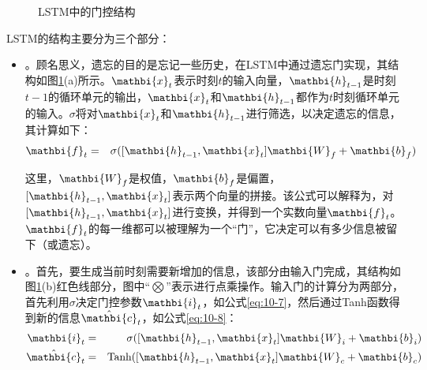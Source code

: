 \begin{figure}[htp]
\centering
{}
\caption{LSTM中的门控结构}
\label{fig:10-11}
\end{figure}

\parinterval LSTM的结构主要分为三个部分：

\begin{itemize}
\vspace{0.5em}
\item {\small{}}。顾名思义，遗忘的目的是忘记一些历史，在LSTM中通过遗忘门实现，其结构如图\ref{fig:10-11}(a)所示。$\mathbi{x}_{t}$表示时刻$t$的输入向量，$\mathbi{h}_{t-1}$是时刻$t-1$的循环单元的输出，$\mathbi{x}_{t}$和$\mathbi{h}_{t-1}$都作为$t$时刻循环单元的输入。$\sigma$将对$\mathbi{x}_{t}$和$\mathbi{h}_{t-1}$进行筛选，以决定遗忘的信息，其计算如下：
\begin{eqnarray}
\mathbi{f}_t &=& \sigma([\mathbi{h}_{t-1},\mathbi{x}_{t}] \mathbi{W}_f + \mathbi{b}_f )
\label{eq:10-6}
\end{eqnarray}

这里，$\mathbi{W}_f$是权值，$\mathbi{b}_f$是偏置，$[\mathbi{h}_{t-1},\mathbi{x}_{t}]$表示两个向量的拼接。该公式可以解释为，对$[\mathbi{h}_{t-1},\mathbi{x}_{t}]$进行变换，并得到一个实数向量$\mathbi{f}_t$。$\mathbi{f}_t$的每一维都可以被理解为一个“门”，它决定可以有多少信息被留下（或遗忘）。
\vspace{0.5em}
\item {\small{}}。首先，要生成当前时刻需要新增加的信息，该部分由输入门完成，其结构如图\ref{fig:10-11}(b)红色线部分，图中“$\bigotimes$”表示进行点乘操作。输入门的计算分为两部分，首先利用$\sigma$决定门控参数$\mathbi{i}_t$，如公式\eqref{eq:10-7}，然后通过Tanh函数得到新的信息$\hat{\mathbi{c}}_t$，如公式\eqref{eq:10-8}：
\begin{eqnarray}
\mathbi{i}_t & = & \sigma ([\mathbi{h}_{t-1},\mathbi{x}_{t}] \mathbi{W}_i + \mathbi{b}_i ) \label{eq:10-7} \\
\hat{\mathbi{c}}_t & = & \textrm{Tanh} ([\mathbi{h}_{t-1},\mathbi{x}_{t}] \mathbi{W}_c + \mathbi{b}_c ) \label{eq:10-8}
\end{eqnarray}


\end{itemize}
